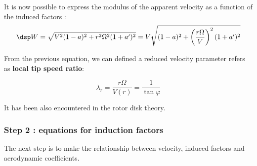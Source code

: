 It is now possible to express the modulus of the apparent velocity as a function of the induced factors :
\begin{equation}
\dsp W = \sqrt{V^2(1-a)^2 + r^2 \Omega^2 (1+a')^2} = V  \sqrt{(1-a)^2 + \left(\frac{r \Omega}{V}\right)^2 (1+a')^2}
\label{eq:W}
\end{equation}


From the previous equation, we can defined a reduced velocity parameter  refers as \textbf{local tip speed ratio}:

\begin{equation}
    \lambda_r =  \frac{r \Omega}{V(r)} = \frac{1}{\tan \varphi}
  \label{eq:lambda_r}
\end{equation}

It has been also encountered in the rotor disk theory.


\subsubsection{\sc Step 2 : equations for induction factors}

The next step is to make the relationship between velocity, induced factors 
and aerodynamic coefficients.


